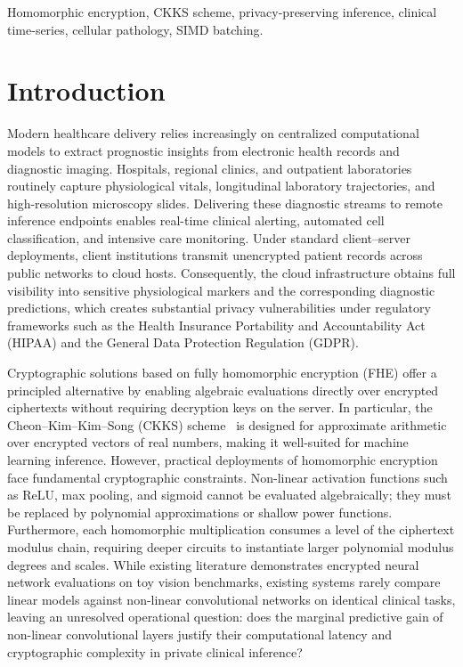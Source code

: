 \documentclass[conference]{IEEEtran}
\begin{document}
\begin{abstract}
\end{abstract}

\begin{IEEEkeywords}
Homomorphic encryption, CKKS scheme, privacy-preserving inference, clinical time-series, cellular pathology, SIMD batching.
\end{IEEEkeywords}

\section{Introduction}

Modern healthcare delivery relies increasingly on centralized computational models to extract prognostic insights from electronic health records and diagnostic imaging. Hospitals, regional clinics, and outpatient laboratories routinely capture physiological vitals, longitudinal laboratory trajectories, and high-resolution microscopy slides. Delivering these diagnostic streams to remote inference endpoints enables real-time clinical alerting, automated cell classification, and intensive care monitoring. Under standard client--server deployments, client institutions transmit unencrypted patient records across public networks to cloud hosts. Consequently, the cloud infrastructure obtains full visibility into sensitive physiological markers and the corresponding diagnostic predictions, which creates substantial privacy vulnerabilities under regulatory frameworks such as the Health Insurance Portability and Accountability Act (HIPAA) and the General Data Protection Regulation (GDPR).

Cryptographic solutions based on fully homomorphic encryption (FHE) offer a principled alternative by enabling algebraic evaluations directly over encrypted ciphertexts without requiring decryption keys on the server. In particular, the Cheon--Kim--Kim--Song (CKKS) scheme~\cite{cheon2017} is designed for approximate arithmetic over encrypted vectors of real numbers, making it well-suited for machine learning inference. However, practical deployments of homomorphic encryption face fundamental cryptographic constraints. Non-linear activation functions such as ReLU, max pooling, and sigmoid cannot be evaluated algebraically; they must be replaced by polynomial approximations or shallow power functions. Furthermore, each homomorphic multiplication consumes a level of the ciphertext modulus chain, requiring deeper circuits to instantiate larger polynomial modulus degrees and scales. While existing literature demonstrates encrypted neural network evaluations on toy vision benchmarks, existing systems rarely compare linear models against non-linear convolutional networks on identical clinical tasks, leaving an unresolved operational question: does the marginal predictive gain of non-linear convolutional layers justify their computational latency and cryptographic complexity in private clinical inference?
\end{document}
